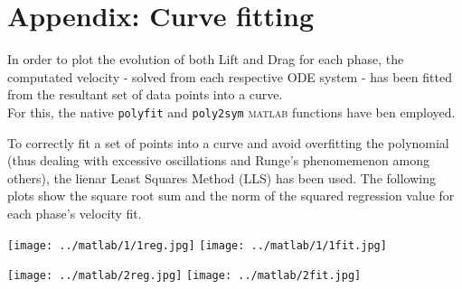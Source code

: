 \section*{Appendix: Curve fitting}
In order to plot the evolution of both Lift and Drag for each phase, the computated velocity - solved from each respective ODE system - has been fitted from the resultant set of data points into a curve.\\
For this, the native \texttt{polyfit} and \texttt{poly2sym} \textsc{matlab} functions have ben employed. 

To correctly fit a set of points into a curve and avoid overfitting the polynomial (thus dealing with excessive oscillations and Runge's phenomemenon among others), the lienar Least Squares Method (LLS) has been used. The following plots show the square root sum and the norm of the squared regression value for each phase's velocity fit.

\begin{center}
	\texttt{[image: ../matlab/1/1reg.jpg]}
	\texttt{[image: ../matlab/1/1fit.jpg]}
	\vspace{0.5cm}
	\label{fig:1reg}
	\vspace{0.25cm}
	\label{fig:1fit}
\end{center}

\begin{center}
	\texttt{[image: ../matlab/2reg.jpg]}
	\texttt{[image: ../matlab/2fit.jpg]}
	\vspace{0.5cm}
	\label{fig:2reg}
	\vspace{0.25cm}
	\label{fig:2fit}
\end{center}